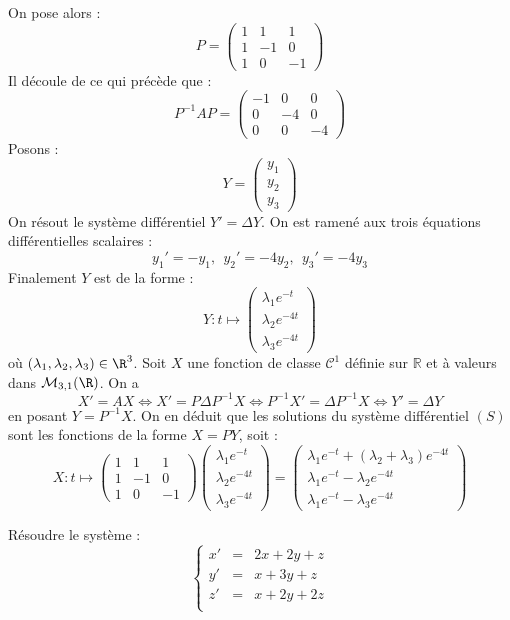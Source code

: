 \documentclass[a4paper,10pt]{report}
\begin{document}
On pose alors :
$$P = \left(\begin{array}{ccc} 1 & 1 & 1 \\ 1 & -1 & 0 \\ 1 & 0 & -1 \end{array}\right)$$
Il découle de ce qui précède que : 
$$P^{-1} A P = \left(\begin{array}{ccc} -1 & 0 & 0 \\ 0 & -4 & 0 \\ 0 & 0 & -4 \end{array}\right)$$
Posons :
$$Y = \left(\begin{array}{c} y_1 \\ y_2 \\ y_3\end{array}\right)$$
On résout le système différentiel $Y' = \Delta Y$. On est ramené aux trois équations différentielles scalaires : 
$$y_1' = -y_1, ~~ y_2' = -4 y_2 ,~~y_3' = -4 y_3$$
Finalement $Y$ est de la forme :
$$Y : t \mapsto \left(\begin{array}{c} \lambda_1 e^{-t} \\ \lambda_2 e^{-4t} \\ \lambda_3 e^{-4t}\end{array}\right)$$
où $(\lambda_1, \lambda_2, \lambda_3) \in \R^3$.
Soit $X$ une fonction de classe $\mathcal C^1$ définie sur $\mathbb R$ et à valeurs dans $\mathcal{M}_{3,1}(\R)$. On a 
$$X' = AX \iff X' = P\Delta P^{-1}X \iff P^{-1}X' = \Delta P^{-1}X \iff Y' = \Delta Y$$
en posant $Y = P^{-1}X$. On en déduit que les solutions du système différentiel $(S)$ sont les fonctions de la forme $X = PY$, soit : 
$$X : t \mapsto \left(\begin{array}{ccc} 1 & 1 & 1 \\ 1 & -1 & 0 \\ 1 & 0 & -1 \end{array}\right)\left(\begin{array}{c} \lambda_1 e^{-t} \\ \lambda_2 e^{-4t} \\ \lambda_3 e^{-4t}\end{array}\right) = \left(\begin{array}{c} \lambda_1 e^{-t} + (\lambda_2+\lambda_3)e^{-4t} \\ \lambda_1 e^{-t} - \lambda_2 e^{-4t} \\ \lambda_1 e^{-t} - \lambda_3 e^{-4t}\end{array}\right)$$

\begin{Exercice}{} Résoudre le système :
$$ \left\lbrace \begin{array}{ccl}
x' & = &2x+2y+z \\
y' & = &x+3y+z \\
z' & =& x+2y+2z \\
\end{array}\right.$$
\end{Exercice}
\end{document}
